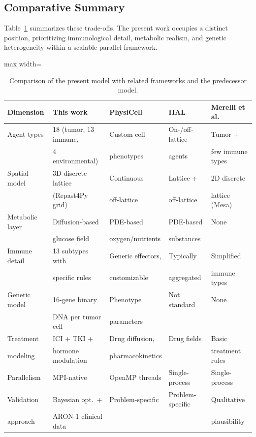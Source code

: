 \subsection{Comparative Summary}
\label{subsec:rw_comparison}

Table~\ref{tab:framework_comparison} summarizes these trade-offs. The present work occupies a distinct position, prioritizing immunological detail, metabolic realism, and genetic heterogeneity within a scalable parallel framework.

\begin{table}[htbp]
\centering
\caption{Comparison of the present model with related frameworks and the predecessor model.}
\label{tab:framework_comparison}
\footnotesize
\begin{adjustbox}{max width=\textwidth}
\begin{tabular}{lllll}
\toprule
\textbf{Dimension} & \textbf{This work} & \textbf{PhysiCell} & \textbf{HAL} & \textbf{Merelli et al.} \\
\midrule
Agent types & 18 (tumor, 13 immune, & Custom cell & On-/off-lattice & Tumor + \\
 & 4 environmental) & phenotypes & agents & few immune types \\
\addlinespace
Spatial model & 3D discrete lattice & Continuous & Lattice + & 2D discrete \\
 & (Repast4Py grid) & off-lattice & off-lattice & lattice (Mesa) \\
\addlinespace
Metabolic layer & Diffusion-based & PDE-based & PDE-based & None \\
 & glucose field & oxygen/nutrients & substances & \\
\addlinespace
Immune detail & 13 subtypes with & Generic effectors, & Typically & Simplified \\
 & specific rules & customizable & aggregated & immune types \\
\addlinespace
Genetic model & 16-gene binary & Phenotype & Not standard & None \\
 & DNA per tumor cell & parameters & & \\
\addlinespace
Treatment & ICI + TKI + & Drug diffusion, & Drug fields & Basic \\
modeling & hormone modulation & pharmacokinetics & & treatment rules \\
\addlinespace
Parallelism & MPI-native & OpenMP threads & Single-process & Single-process \\
\addlinespace
Validation & Bayesian opt.\ + & Problem-specific & Problem-specific & Qualitative \\
approach & ARON-1 clinical data & & & plausibility \\
\bottomrule
\end{tabular}
\end{adjustbox}
\end{table}

